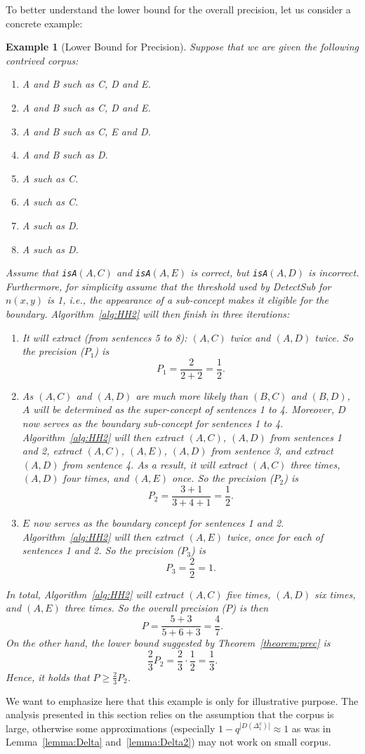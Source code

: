 \documentclass[10pt,journal,cspaper,compsoc]{IEEEtran}
\newcommand{\isA}{{\tt isA}}
\newtheorem{example}{Example}
\begin{document}
To better understand the lower bound for the overall precision, let us consider a concrete example:
\begin{example}[Lower Bound for Precision]
\label{ex:lower-bound}
Suppose that we are given the following contrived corpus:
\begin{enumerate}[1)]
\item A and B such as C, D and E.
\item A and B such as C, D and E.
\item A and B such as C, E and D.
\item A and B such as D.
\item A such as C.
\item A such as C.
\item A such as D.
\item A such as D.
\end{enumerate}
Assume that \isA$(A, C)$ and \isA$(A, E)$ is correct, but \isA$(A, D)$ is incorrect. Furthermore, for simplicity assume that the threshold used by \emph{DetectSub} for $n(x, y)$ is 1, i.e., the appearance of a sub-concept makes it eligible for the boundary. Algorithm~\ref{alg:HH2} will then finish in three iterations:
\begin{enumerate}[\textbf{I}1)]
\item It will extract (from sentences 5 to 8): $(A, C)$ twice and $(A, D)$ twice. So the precision ($P_1$) is 
$$P_1=\frac{2}{2+2}=\frac{1}{2}.$$
\item As $(A, C)$ and $(A, D)$ are much more likely than $(B, C)$ and $(B, D)$, $A$ will be determined as the super-concept of sentences 1 to 4. 
Moreover, $D$ now serves as the boundary sub-concept for sentences 1 to 4.
Algorithm~\ref{alg:HH2} will then extract $(A,C)$, $(A,D)$ from sentences 1 and 2, extract $(A,C)$, $(A,E)$, $(A,D)$ from sentence 3, and extract $(A,D)$ from sentence 4. As a result, it will extract $(A,C)$ three times, $(A,D)$ four times, and $(A,E)$ once. So the precision ($P_2$) is 
$$P_2=\frac{3 + 1}{3+4+1}=\frac{1}{2}.$$
\item $E$ now serves as the boundary concept for sentences 1 and 2. Algorithm~\ref{alg:HH2} will then extract $(A,E)$ twice, once for each of sentences 1 and 2. So the precision ($P_3$) is 
$$P_3=\frac{2}{2} = 1.$$
\end{enumerate}
In total, Algorithm~\ref{alg:HH2} will extract $(A,C)$ five times, $(A,D)$ six times, and $(A,E)$ three times. So the overall precision ($P$) is then
$$P=\frac{5 + 3}{5+6+3}=\frac{4}{7}.$$
On the other hand, the lower bound suggested by Theorem~\ref{theorem:prec} is 
$$\frac{2}{3}P_2=\frac{2}{3}\cdot\frac{1}{2}=\frac{1}{3}.$$ 
Hence, it holds that $P\geq\frac{2}{3}P_2$.
\end{example}
We want to emphasize here that this example is only for illustrative purpose. The analysis presented in this section relies on the assumption that the corpus is large, otherwise some approximations (especially $1-q^{|D(\Delta_1^x)|}\approx 1$ as was in Lemma~\ref{lemma:Delta} and~\ref{lemma:Delta2}) may not work on small corpus.
\end{document}
